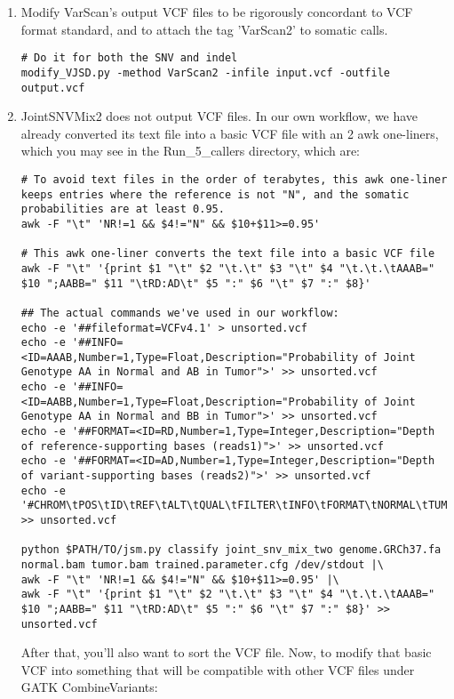 \documentclass[10pt,letterpaper]{article}
\begin{document}
\begin{sloppypar}
\begin{enumerate}
\item
Modify VarScan's output VCF files to be rigorously concordant to VCF format standard, and to attach the tag 'VarScan2' to somatic calls. 
\begin{lstlisting}
# Do it for both the SNV and indel
modify_VJSD.py -method VarScan2 -infile input.vcf -outfile output.vcf
\end{lstlisting}


\item
JointSNVMix2 does not output VCF files. In our own workflow, we have already converted its text file into a basic VCF file with an 2 awk one-liners, which you may see in the Run\_5\_callers directory, which are:

\begin{lstlisting}
# To avoid text files in the order of terabytes, this awk one-liner keeps entries where the reference is not "N", and the somatic probabilities are at least 0.95.
awk -F "\t" 'NR!=1 && $4!="N" && $10+$11>=0.95'
	
# This awk one-liner converts the text file into a basic VCF file
awk -F "\t" '{print $1 "\t" $2 "\t.\t" $3 "\t" $4 "\t.\t.\tAAAB=" $10 ";AABB=" $11 "\tRD:AD\t" $5 ":" $6 "\t" $7 ":" $8}'

## The actual commands we've used in our workflow:
echo -e '##fileformat=VCFv4.1' > unsorted.vcf
echo -e '##INFO=<ID=AAAB,Number=1,Type=Float,Description="Probability of Joint Genotype AA in Normal and AB in Tumor">' >> unsorted.vcf
echo -e '##INFO=<ID=AABB,Number=1,Type=Float,Description="Probability of Joint Genotype AA in Normal and BB in Tumor">' >> unsorted.vcf
echo -e '##FORMAT=<ID=RD,Number=1,Type=Integer,Description="Depth of reference-supporting bases (reads1)">' >> unsorted.vcf
echo -e '##FORMAT=<ID=AD,Number=1,Type=Integer,Description="Depth of variant-supporting bases (reads2)">' >> unsorted.vcf
echo -e '#CHROM\tPOS\tID\tREF\tALT\tQUAL\tFILTER\tINFO\tFORMAT\tNORMAL\tTUMOR' >> unsorted.vcf

python $PATH/TO/jsm.py classify joint_snv_mix_two genome.GRCh37.fa normal.bam tumor.bam trained.parameter.cfg /dev/stdout |\
awk -F "\t" 'NR!=1 && $4!="N" && $10+$11>=0.95' |\
awk -F "\t" '{print $1 "\t" $2 "\t.\t" $3 "\t" $4 "\t.\t.\tAAAB=" $10 ";AABB=" $11 "\tRD:AD\t" $5 ":" $6 "\t" $7 ":" $8}' >> unsorted.vcf
\end{lstlisting}
	
After that, you'll also want to sort the VCF file. Now, to modify that basic VCF into something that will be compatible with other VCF files under GATK CombineVariants:
	

\end{enumerate}
\end{sloppypar}
\end{document}

